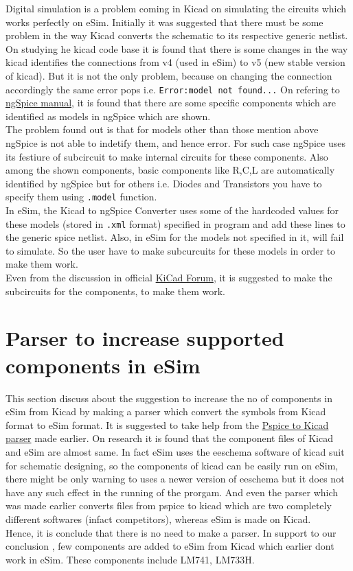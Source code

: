 \documentclass[12pt,a4paper]{report}
\begin{document}
Digital simulation is a problem coming in Kicad on simulating the circuits which works perfectly on eSim. Initially it was suggested that there must be some problem in the way Kicad converts the schematic to its respective generic netlist. On studying he kicad code base it is found that there is some changes in the way kicad identifies the connections from v4 (used in eSim) to v5 (new stable version of kicad). But it is not the only problem, because on changing the connection accordingly the same error pops i.e. \texttt{Error:model not found...} On refering to \href{http://ngspice.sourceforge.net/docs/ngspice-manual.pdf}{ngSpice manual}, it is found that there are some specific components which are identified as models in ngSpice which are shown.
\vspace{5mm}
\\
The problem found out is that for models other than those mention above ngSpice is not able to indetify them, and hence error. For such case ngSpice uses its festiure of subcircuit to make internal circuits for these components. Also among the shown components, basic components like R,C,L are automatically identified by ngSpice but for others i.e. Diodes and Transistors you have to specify them using \texttt{.model} function.
\vspace{5mm}
\\
In eSim, the Kicad to ngSpice Converter uses some of the hardcoded values for these models (stored in \texttt{.xml} format) specified in program and add these lines to the generic spice netlist. Also, in eSim for the models not specified in it, will fail to simulate. So the user have to make subcurcuits for these models in order to make them work.
\vspace{5mm}
\\
Even from the discussion in official \href{https://forum.kicad.info/t/digital-simulation/11072}{KiCad Forum}, it is suggested to make the subcircuits for the components, to make them work.

\section{Parser to increase supported components in eSim}
This section discuss about the suggestion to increase the no of components in eSim from Kicad by making a parser which convert the symbols from Kicad format to eSim format. It is suggested to take help from the \href{https://github.com/FOSSEE/Pspice-Kicad-Converter}{Pspice to Kicad parser} made earlier. On research it is found that the component files of Kicad and eSim are almost same. In fact eSim uses the eeschema software of kicad suit for schematic designing, so the components of kicad can be easily run on eSim, there might be only warning to uses a newer version of eeschema but it does not have any such effect in the running of the prorgam. And even the parser which was made earlier converts files from pspice to kicad which are two completely different softwares (infact competitors), whereas eSim is made on Kicad.
\\ Hence, it is conclude that there is no need to make a parser. In support to our conclusion , few components are added to eSim from Kicad which earlier dont work in eSim. These components include LM741, LM733H.
\end{document}
